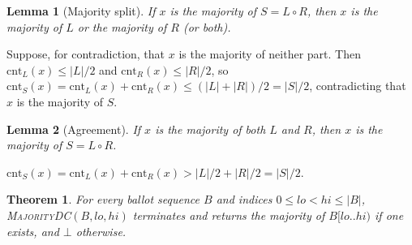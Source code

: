 \documentclass[conference]{IEEEtran}
\newtheorem{lemma}{Lemma}
\newtheorem{theorem}{Theorem}
\newcommand{\cnt}{\mathrm{cnt}}
\begin{document}
\begin{lemma}[Majority split]\label{lem:split}
If $x$ is the majority of $S = L \circ R$, then $x$ is the majority of $L$ or
the majority of $R$ (or both).
\end{lemma}

\begin{IEEEproof}
Suppose, for contradiction, that $x$ is the majority of neither part. Then
$\cnt_L(x) \le |L|/2$ and $\cnt_R(x) \le |R|/2$, so
$\cnt_S(x) = \cnt_L(x) + \cnt_R(x) \le (|L| + |R|)/2 = |S|/2$,
contradicting that $x$ is the majority of $S$.
\end{IEEEproof}

\begin{lemma}[Agreement]\label{lem:agree}
If $x$ is the majority of both $L$ and $R$, then $x$ is the majority of
$S = L \circ R$.
\end{lemma}

\begin{IEEEproof}
$\cnt_S(x) = \cnt_L(x) + \cnt_R(x) > |L|/2 + |R|/2 = |S|/2$.
\end{IEEEproof}

\begin{theorem}\label{thm:correct}
For every ballot sequence $B$ and indices $0 \le lo < hi \le |B|$,
\textsc{MajorityDC}$(B, lo, hi)$ terminates and returns the majority of
$B[lo..hi)$ if one exists, and $\bot$ otherwise.
\end{theorem}
\end{document}
